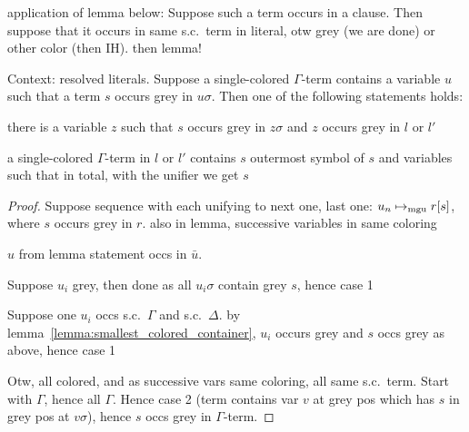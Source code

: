 \documentclass[,%
	draft=false,%
	numbers=noendperiod
	11pt,
	a4paper,
	oneside,%
	openany,
]{memoir}
\begin{document}
application of lemma below:
Suppose such a term occurs in a clause. Then suppose that it occurs in same s.c.\ term in literal, otw grey (we are done) or other color (then IH). then lemma!

\begin{lemma}
	\label{lemma:u_sigma_contains_delta_term}
	Context: resolved literals.
	Suppose a single-colored $\Gamma$-term contains a variable $u$ such that a term $s$ occurs grey in $u\sigma$.
	Then one of the following statements holds:
	\begin{compactenum}
		\item there is a variable $z$ such that $s$ occurs grey in $z\sigma$ and $z$ occurs grey in $l$ or $l'$ 
		\item a single-colored $\Gamma$-term in $l$ or $l'$ contains $s$ outermost symbol of $s$ and variables such that in total, with the unifier we get $s$
	\end{compactenum}
\end{lemma}
\begin{proof}
	Suppose sequence with each unifying to next one, last one: $u_n \mapsto_{\operatorname{mgu}} r[s]$, where $s$ occurs grey in $r$.
	also in lemma, successive variables in same coloring

	$u$ from lemma statement occs in $\bar u$. 	
	
	Suppose $u_i$ grey, then done as all $u_i\sigma$ contain grey $s$, hence case 1

	Suppose one $u_i$ occs s.c.\ $\Gamma$ and  s.c.\ $\Delta$. by lemma~\ref{lemma:smallest_colored_container}, $u_i$ occurs grey and $s$ occs grey as above, hence case 1

	Otw, all colored, and as successive vars same coloring, all same s.c.\ term.
	Start with $\Gamma$, hence all $\Gamma$. 
	Hence case 2 (term contains var $v$ at grey pos which has $s$ in grey pos at $v\sigma$), hence $s$ occs grey in $\Gamma$-term.



\end{proof}
\end{document}
